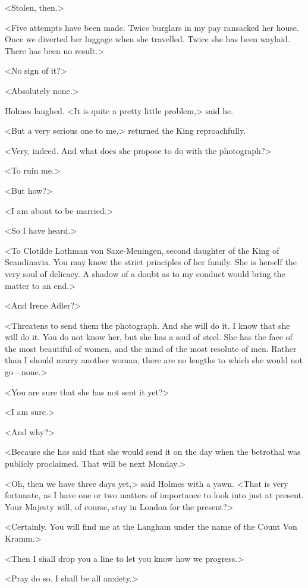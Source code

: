 <Stolen, then.>

<Five attempts have been made. Twice burglars in my pay ransacked her house. Once we diverted her luggage when she travelled. Twice she has been waylaid. There has been no result.>

<No sign of it?>

<Absolutely none.>

Holmes laughed. <It is quite a pretty little problem,> said he.

<But a very serious one to me,> returned the King reproachfully.

<Very, indeed. And what does she propose to do with the photograph?>

<To ruin me.>

<But how?>

<I am about to be married.>

<So I have heard.>

<To Clotilde Lothman von Saxe-Meningen, second daughter of the King of Scandinavia. You may know the strict principles of her family. She is herself the very soul of delicacy. A shadow of a doubt as to my conduct would bring the matter to an end.>

<And Irene Adler?>

<Threatens to send them the photograph. And she will do it. I know that she will do it. You do not know her, but she has a soul of steel. She has the face of the most beautiful of women, and the mind of the most resolute of men. Rather than I should marry another woman, there are no lengths to which she would not go—none.>

<You are sure that she has not sent it yet?>

<I am sure.>

<And why?>

<Because she has said that she would send it on the day when the betrothal was publicly proclaimed. That will be next Monday.>

<Oh, then we have three days yet,> said Holmes with a yawn. <That is very fortunate, as I have one or two matters of importance to look into just at present. Your Majesty will, of course, stay in London for the present?>

<Certainly. You will find me at the Langham under the name of the Count Von Kramm.>

<Then I shall drop you a line to let you know how we progress.>

<Pray do so. I shall be all anxiety.>

